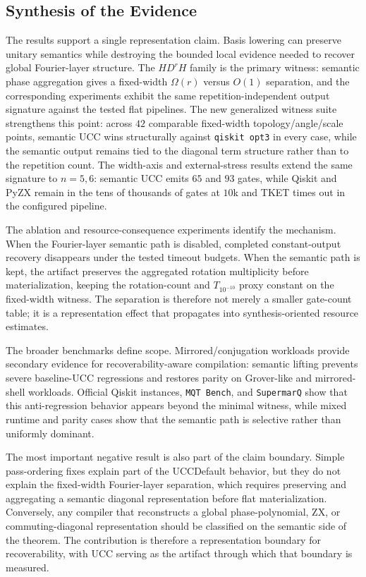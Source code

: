 \documentclass[11pt]{article}
\begin{document}
\subsection{Synthesis of the Evidence}

The results support a single representation claim. Basis lowering can preserve
unitary semantics while destroying the bounded local evidence needed to recover
global Fourier-layer structure. The $H D^r H$ family is the primary witness:
semantic phase aggregation gives a fixed-width $\Omega(r)$ versus $O(1)$
separation, and the corresponding experiments exhibit the same
repetition-independent output signature against the tested flat pipelines. The
new generalized witness suite strengthens this point: across $42$ comparable
fixed-width topology/angle/scale points, semantic UCC wins structurally against
\texttt{qiskit opt3} in every case, while the semantic output remains tied to
the diagonal term structure rather than to the repetition count. The
width-axis and external-stress results extend the same signature to $n=5,6$:
semantic UCC emits $65$ and $93$ gates, while Qiskit and PyZX remain in the
tens of thousands of gates at $10$k and TKET times out in the configured
pipeline.

The ablation and resource-consequence experiments identify the mechanism. When
the Fourier-layer semantic path is disabled, completed constant-output recovery
disappears under the tested timeout budgets. When the semantic path is kept,
the artifact preserves the aggregated rotation multiplicity before
materialization, keeping the rotation-count and $T_{10^{-10}}$ proxy constant
on the fixed-width witness. The separation is therefore not merely a smaller
gate-count table; it is a representation effect that propagates into
synthesis-oriented resource estimates.

The broader benchmarks define scope. Mirrored/conjugation workloads provide
secondary evidence for recoverability-aware compilation: semantic lifting
prevents severe baseline-UCC regressions and restores parity on Grover-like and
mirrored-shell workloads. Official Qiskit instances, \texttt{MQT Bench}, and
\texttt{SupermarQ} show that this anti-regression behavior appears beyond the
minimal witness, while mixed runtime and parity cases show that the semantic
path is selective rather than uniformly dominant.

The most important negative result is also part of the claim boundary. Simple
pass-ordering fixes explain part of the UCCDefault behavior, but they do not
explain the fixed-width Fourier-layer separation, which requires preserving and
aggregating a semantic diagonal representation before flat materialization.
Conversely, any compiler that reconstructs a global phase-polynomial, ZX, or
commuting-diagonal representation should be classified on the semantic side of
the theorem. The contribution is therefore a representation boundary for
recoverability, with UCC serving as the artifact through which that boundary is
measured.
\end{document}
